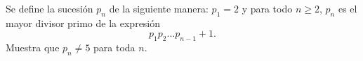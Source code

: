 Se define la sucesión $p_n$ de la siguiente manera: $p_1=2$ y para todo $n\geq 2$, $p_n$ es el mayor divisor primo de la expresión
\[p_1p_2\dots p_{n-1}+1.\]
Muestra que $p_n\neq 5$ para toda $n$.